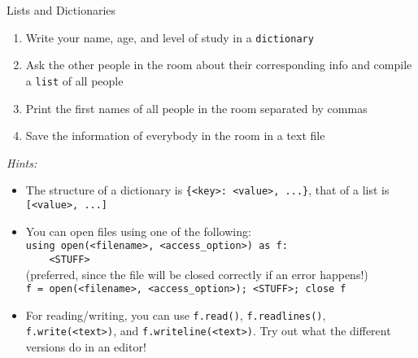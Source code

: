 \documentclass[10pt, aspectratio=169]{beamer}
\begin{document}
\begin{frame}{Lists and Dictionaries}
  \begin{enumerate}
  \item
    Write your name, age, and level of study in a \texttt{dictionary}
  \item
    Ask the other people in the room about their corresponding info and compile a \texttt{list} of all people
  \item
    Print the first names of all people in the room separated by commas
  \item
    Save the information of everybody in the room in a text file
  \end{enumerate}

  \textit{Hints:}
  \begin{itemize}
  \item
    The structure of a dictionary is \texttt{\{<key>:\ <value>, ...\}}, that of a list is \texttt{[<value>, ...]}
  \item
    You can open files using one of the following: \\
    \quad \texttt{using open(<filename>, <access\_option>) as f:} \\
    \quad \texttt{~~~~<STUFF>} \\
    (preferred, since the file will be closed correctly if an error happens!) \\
    \quad \texttt{f = open(<filename>, <access\_option>); <STUFF>; close f}
  \item
    For reading/writing, you can use \texttt{f.read()}, \texttt{f.readlines()}, \texttt{f.write(<text>)}, and \texttt{f.writeline(<text>)}. Try out what the different versions do in an editor! 
  \end{itemize}
\end{frame}
\end{document}
